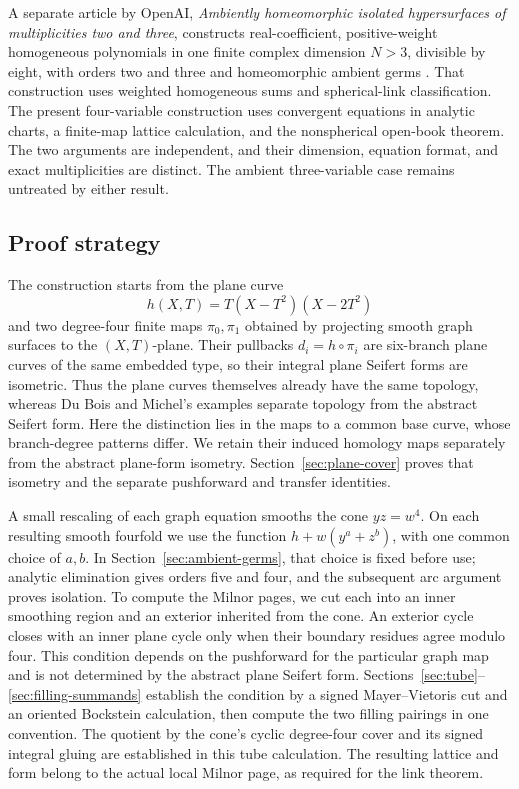 A separate article by OpenAI, \emph{Ambiently homeomorphic isolated
hypersurfaces of multiplicities two and three}, constructs
real-coefficient, positive-weight homogeneous polynomials in one
finite complex dimension \(N>3\), divisible by eight, with orders
two and three and homeomorphic ambient germs
\cite[Theorem~1.1]{OpenAI2026Multiplicity23}. That construction uses weighted
homogeneous sums and spherical-link classification. The present
four-variable construction uses convergent equations in analytic
charts, a finite-map lattice calculation, and the nonspherical
open-book theorem. The two arguments are independent, and their
dimension, equation format, and exact multiplicities are distinct.
The ambient three-variable case remains untreated by either result.

\subsection*{Proof strategy}

The construction starts from the plane curve
\[
 h(X,T)=T(X-T^2)(X-2T^2)
\]
and two degree-four finite maps \(\pi_0,\pi_1\) obtained by projecting
smooth graph surfaces to the \((X,T)\)-plane. Their pullbacks \(d_i=h\circ\pi_i\)
are six-branch plane curves of the same embedded type, so their
integral plane Seifert forms are isometric. Thus the plane curves
themselves already have the same topology, whereas Du Bois and Michel's
examples separate topology from the abstract Seifert form. Here the
distinction lies in the maps to a common base curve, whose branch-degree
patterns differ. We retain their induced homology maps separately from
the abstract plane-form isometry. Section~\ref{sec:plane-cover} proves
that isometry and the separate pushforward and transfer identities.

A small rescaling of each graph equation smooths the cone \(yz=w^4\).
On each resulting smooth fourfold we use the function
\(h+w(y^a+z^b)\), with one common choice of \(a,b\). In
Section~\ref{sec:ambient-germs}, that choice is fixed before use;
analytic elimination gives orders five and four, and the subsequent
arc argument proves isolation. To compute the Milnor pages, we cut
each into an inner smoothing region and an exterior inherited from
the cone. An exterior cycle closes with an inner plane cycle only
when their boundary residues agree modulo four. This condition
depends on the pushforward for the particular graph map and is not
determined by the abstract plane Seifert form.
Sections~\ref{sec:tube}--\ref{sec:filling-summands} establish the
condition by a signed Mayer--Vietoris cut and an oriented Bockstein
calculation, then compute the two filling pairings in one convention.
The quotient by the cone's cyclic degree-four cover and its signed
integral gluing are established in this tube calculation. The resulting
lattice and form belong to the actual local Milnor page, as required
for the link theorem.

